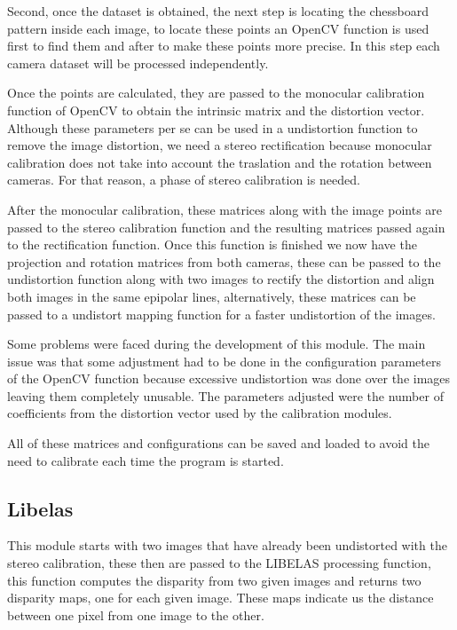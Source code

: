 \documentclass[10pt,a4paper,twocolumn,twoside]{article}
\begin{document}
	Second, once the dataset is obtained, the next step is locating the chessboard pattern inside each image, to locate these points an OpenCV function is used first to find them and after to make these points more precise. In this step each camera dataset will be processed independently. 
	
	Once the points are calculated, they are passed to the monocular calibration function of OpenCV to obtain the intrinsic matrix and the distortion vector.  Although these parameters per se can be used in a undistortion function to remove the image distortion, we need a stereo rectification because monocular calibration does not take into account the traslation and the rotation between cameras. For that reason, a phase of stereo calibration is needed. 
	
	After the monocular calibration, these matrices along with the image points are passed to the stereo calibration function and the resulting matrices passed again to the rectification function. Once this function is finished we now have the projection and rotation matrices from both cameras, these can be passed to the undistortion function along with two images to rectify the distortion and align both images in the same epipolar lines, alternatively, these matrices can be passed to a undistort mapping function for a faster undistortion of the images.  
	
	Some problems were faced during the development of this module. The main issue was that some adjustment had to be done in the configuration parameters of the OpenCV function because excessive undistortion was done over the images leaving them completely unusable. The parameters adjusted were the number of coefficients from the distortion vector used by the calibration modules. 
	
	All of these matrices and configurations can be saved and loaded to avoid the need to calibrate each time the program is started.  
	
	\subsection{Libelas}
	\label{sec:libelas}
	 This module starts with two images that have already been undistorted with the stereo calibration, these then are passed to the LIBELAS processing function, this function computes the disparity from two given images and returns two disparity maps, one for each given image. These maps indicate us the distance between one pixel from one image to the other.  
	 
\end{document}
